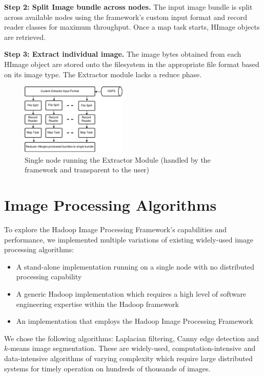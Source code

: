 \documentclass[conference]{IEEEtran}
\begin{document}
\textbf{Step 2: Split Image bundle across nodes.} The input image
bundle is split across available nodes using the framework's custom
input format and record reader classes for maximum throughput. Once a
map task starts, HImage objects are retrieved.

\textbf{Step 3: Extract individual image.} The image bytes obtained
from each HImage object are stored onto the filesystem in the
appropriate file format based on its image type.  The Extractor module
lacks a reduce phase.

\begin{figure}[h]
  \centering
  \includegraphics[width=0.45\textwidth]{ext-node}
  \caption{Single node running the Extractor Module (handled by the
    framework and transparent to the user)}
  \label{fig:ext-node}
\end{figure}


\section{Image Processing Algorithms}
\label{algorithms}
To explore the Hadoop Image Processing Framework's capabilities and
performance, we implemented multiple variations of existing
widely-used image processing algorithms:
\begin{itemize}
\item A stand-alone implementation running on a single node with no
  distributed processing capability
\item A generic Hadoop implementation which requires a high level of
  software engineering expertise within the Hadoop framework
\item An implementation that employs the Hadoop Image Processing
  Framework
\end{itemize}

We chose the following algorithms: Laplacian filtering, Canny edge
detection and $k$-means image segmentation.  These are widely-used,
computation-intensive and data-intensive algorithms of varying complexity which
require large distributed systems for timely operation on hundreds of
thousands of images.
\end{document}
